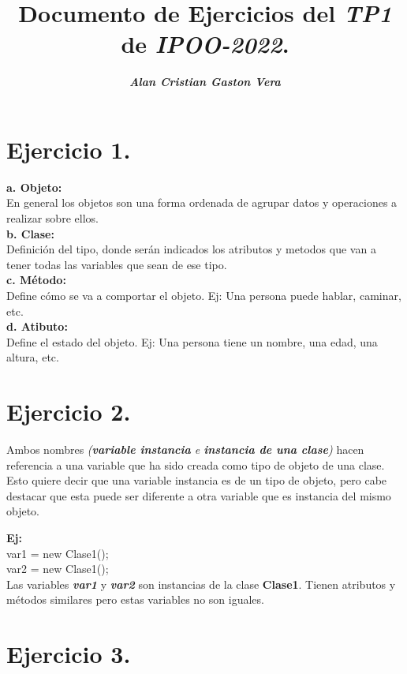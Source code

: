 \documentclass{article}
\title{Documento de Ejercicios del \textit{TP1} de \textit{IPOO-2022}.}
\author{\textbf{\textit{Alan Cristian Gaston Vera}}}
\date{}
\begin{document}
\maketitle
\section*{Ejercicio 1.}

\textbf{a. Objeto: }\\
\indent \indent \indent \indent En general los objetos son una forma ordenada de agrupar datos y operaciones a realizar sobre ellos.
\\
\textbf{b. Clase:}\\
\indent \indent \indent \indent Definición del tipo, donde serán indicados los atributos y metodos que van a tener todas las variables que sean de ese tipo.
\\
\textbf{c. Método:}\\
\indent \indent \indent \indent Define cómo se va a comportar el objeto. Ej: Una persona puede hablar, caminar, etc.
\\
\textbf{d. Atibuto:}\\
\indent \indent \indent \indent Define el estado del objeto. Ej: Una persona tiene un nombre, una edad, una altura, etc.

\section*{Ejercicio 2.}

\quad Ambos nombres \textit{(\textbf{variable instancia} e \textbf{instancia de una clase})} hacen
referencia a una variable que ha sido creada como tipo de objeto de una clase.
Esto quiere decir que una variable instancia es de un tipo de objeto,
pero cabe destacar que esta puede ser diferente a otra variable que es instancia del mismo objeto. \par
\textbf{Ej: }\\
\indent var1 = new Clase1();\\ \indent var2 = new Clase1();\\
\indent Las variables \textit{\textbf{var1}} y \textit{\textbf{var2}} son instancias de la clase \textbf{Clase1}. Tienen atributos y métodos similares pero estas variables no son iguales.

\section*{Ejercicio 3.}
\end{document}
